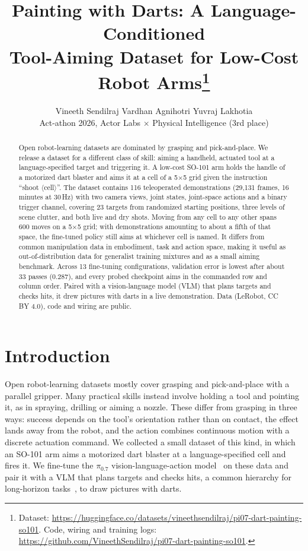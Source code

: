 \documentclass[10pt,letterpaper]{article}
\title{\vspace{-2.2em}\textbf{Painting with Darts: A Language-Conditioned\\Tool-Aiming Dataset for Low-Cost Robot Arms}\thanks{Dataset: \url{https://huggingface.co/datasets/vineethsendilraj/pi07-dart-painting-so101}. Code, wiring and training logs: \url{https://github.com/VineethSendilraj/pi07-dart-painting-so101}.}}
\author{Vineeth Sendilraj \qquad Vardhan Agnihotri \qquad Yuvraj Lakhotia\\[2pt]
\small Act-athon 2026, Actor Labs $\times$ Physical Intelligence (3rd place)}
\date{\vspace{-1.2em}}
\begin{document}
\maketitle

\begin{abstract}
\noindent
Open robot-learning datasets are dominated by grasping and pick-and-place. We release a dataset for a different class of skill: aiming a handheld, actuated tool at a language-specified target and triggering it. A low-cost SO-101 arm holds the handle of a motorized dart blaster and aims it at a cell of a 5$\times$5 grid given the instruction ``shoot $\langle$cell$\rangle$''. The dataset contains 116 teleoperated demonstrations (29{,}131 frames, 16 minutes at 30\,Hz) with two camera views, joint states, joint-space actions and a binary trigger channel, covering 23 targets from randomized starting positions, three levels of scene clutter, and both live and dry shots. Moving from any cell to any other spans 600 moves on a 5$\times$5 grid; with demonstrations amounting to about a fifth of that space, the fine-tuned policy still aims at whichever cell is named. It differs from common manipulation data in embodiment, task and action space, making it useful as out-of-distribution data for generalist training mixtures and as a small aiming benchmark. Across 13 fine-tuning configurations, validation error is lowest after about 33 passes (0.287), and every probed checkpoint aims in the commanded row and column order. Paired with a vision-language model (VLM) that plans targets and checks hits, it drew pictures with darts in a live demonstration. Data (LeRobot, CC BY 4.0), code and wiring are public.
\end{abstract}

\section{Introduction}

Open robot-learning datasets mostly cover grasping and pick-and-place with a parallel gripper. Many practical skills instead involve holding a tool and pointing it, as in spraying, drilling or aiming a nozzle. These differ from grasping in three ways: success depends on the tool's orientation rather than on contact, the effect lands away from the robot, and the action combines continuous motion with a discrete actuation command. We collected a small dataset of this kind, in which an SO-101 arm aims a motorized dart blaster at a language-specified cell and fires it. We fine-tune the $\pi_{0.7}$ vision-language-action model~\cite{pi07} on these data and pair it with a VLM that plans targets and checks hits, a common hierarchy for long-horizon tasks~\cite{hirobot}, to draw pictures with darts.
\end{document}
